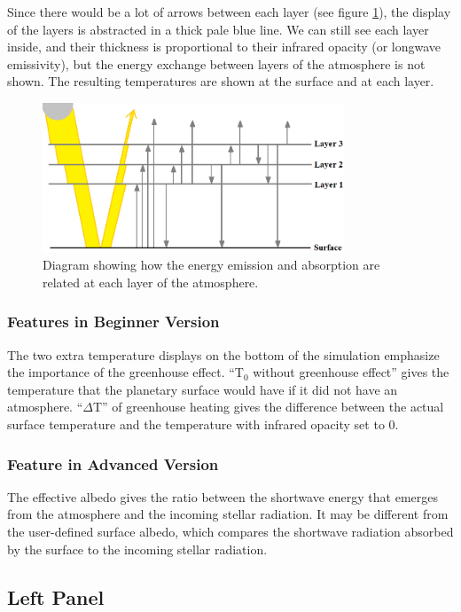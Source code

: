 \documentclass[a4paper,12pt]{article}
\begin{document}
Since there would be a lot of arrows between each layer (see figure \ref{fig:model}), the display of the layers is abstracted in a thick pale blue line. We can still see each layer inside, and their thickness is proportional to their infrared opacity (or longwave emissivity), but the energy exchange between layers of the atmosphere is not shown. The resulting temperatures are shown at the surface and at each layer.

\begin{figure}[H]
  \centering
  \includegraphics[width=90mm]{Model}
  \caption{Diagram showing how the energy emission and absorption are related at each layer of the atmosphere.}
  \label{fig:model}
\end{figure}

\subsubsection*{Features in Beginner Version}
The two extra temperature displays on the bottom of the simulation emphasize the importance of the greenhouse effect. ``T$_0$ without greenhouse effect'' gives the temperature that the planetary surface would have if it did not have an atmosphere. ``$\Delta $T'' of greenhouse heating gives the difference between the actual surface temperature  and the temperature with infrared opacity set to 0.

\subsubsection*{Feature in Advanced Version}
The effective albedo gives the ratio between the shortwave energy that emerges from the atmosphere and the incoming stellar radiation. It may be different from the user-defined surface albedo, which compares the shortwave radiation absorbed by the surface to the incoming stellar radiation. 

\subsection*{Left Panel}
\end{document}

